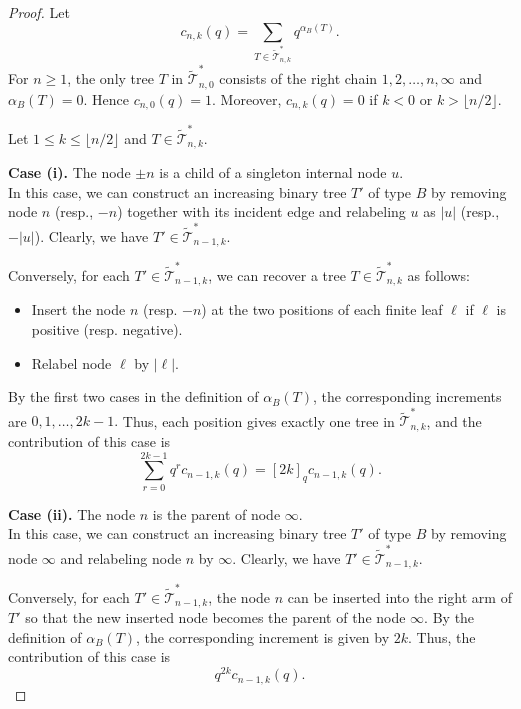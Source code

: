 \documentclass[12pt]{article}
\numberwithin{equation}{section}
\theoremstyle{plain}
\begin{document}
	 				 
	 				 \begin{proof}
	 				 Let $$c_{n,k}(q)=\sum_{T\in\widetilde{\mathcal T}_{n,k}^{*}}q^{\alpha_B(T)}.$$  For $n\ge 1$, the only tree $T$ in
	 				 	$\widetilde{\mathcal T}_{n,0}^{*}$  consists of  the right chain
	 				 	$1, 2,\ldots, n,\infty$ and $\alpha_B(T)=0$. Hence $c_{n,0}(q)=1$. Moreover, $c_{n,k}(q)=0$ if $k<0$ or $k>\lfloor n/2\rfloor$.
	 				 	
	 				 	Let $1\le k\le\lfloor n/2\rfloor$ and $T\in\widetilde{\mathcal T}_{n,k}^{*}$. 
	 				 	
	 				  
	 				 	\noindent\textbf{Case (i).}  The node $\pm n$ is a child of a singleton internal node $u$.\\
	 				 	In this case, we can 
	 				 	construct an increasing binary tree  $T'$ of type $B$   by   removing  node $n$ (resp., $-n$) together with its incident edge  and  relabeling  $u$ as $|u|$ (resp., $-|u|$).
	 				 	Clearly, we have $T'\in \widetilde{\mathcal{T}}_{n-1,k}^{*}$. 
	 				 	
	 				 	 Conversely,   for each
	 				 	$T'\in\widetilde{\mathcal{T}}_{n-1,k}^{*}$,  we can recover a tree $T\in \widetilde{\mathcal{T}}_{n,k}^{*}$ as follows:
	 				 	\begin{itemize}
	 				 	\item Insert the node $n$ (resp. $-n$)   at the two positions of each finite leaf $\ell$ if $\ell$ is positive (resp. negative).
	 				 	\item Relabel node $\ell$ by $|\ell|$.
	 				 	\end{itemize}
	 				 	 By the first two cases in the definition of $\alpha_B(T)$, the corresponding increments are $0, 1, \ldots, 2k-1.$
	 				 	 Thus, each
	 				 	position gives exactly one tree in $\widetilde{\mathcal T}_{n,k}^{*}$, and the contribution of this case is$$ \sum_{r=0}^{2k-1}q^r c_{n-1,k}(q) = [2k]_q c_{n-1,k}(q).$$
	 				 	
	 				 	
	 				 		\noindent\textbf{Case (ii).}  The node $n$ is  the parent of node $\infty$.\\
	 				 	In this case, we can 
	 				 	construct an increasing binary tree $T'$ of type $B$  by   removing  node  $\infty$ and relabeling node $n$ by $\infty$. 
	 				 	Clearly, we have $T'\in \widetilde{\mathcal{T}}_{n-1,k}^{*}$. 
	 				 	
	 				 	Conversely,   for each
	 				 	$T'\in\widetilde{\mathcal{T}}_{n-1,k}^{*}$, the node $n$ can be inserted into the right arm of $T'$ so that the new inserted node becomes the parent of the node $\infty$.   By  the definition of $\alpha_B(T)$, the corresponding increment is given by $2k  $.  Thus, the contribution of this case is$$ q^{2k} c_{n-1,k}(q).$$
	 				 	

\end{proof}
\end{document}
